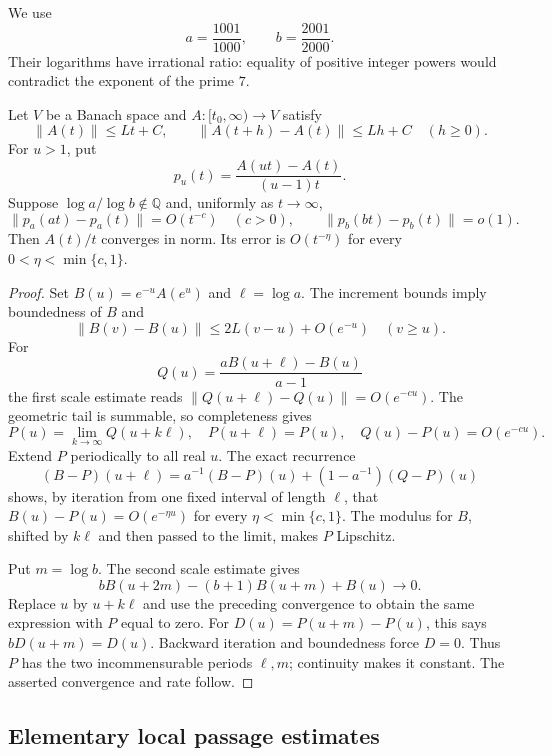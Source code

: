 We use
\begin{equation}\label{eq:ct-two-scales}
 a=\frac{1001}{1000},\qquad b=\frac{2001}{2000}.
\end{equation}
Their logarithms have irrational ratio: equality of positive integer
powers would contradict the exponent of the prime \(7\).

\begin{lemma}\label{lem:ct-two-scale}
Let \(V\) be a Banach space and \(A:[t_0,\infty)\to V\) satisfy
\[
 \|A(t)\|\le Lt+C,\qquad
 \|A(t+h)-A(t)\|\le Lh+C\quad(h\ge0).
\]
For \(u>1\), put
\[
 p_u(t)=\frac{A(ut)-A(t)}{(u-1)t}.
\]
Suppose \(\log a/\log b\notin\mathbb Q\) and, uniformly as
\(t\to\infty\),
\[
 \|p_a(at)-p_a(t)\|=O(t^{-c})\quad(c>0),\qquad
 \|p_b(bt)-p_b(t)\|=o(1).
\]
Then \(A(t)/t\) converges in norm. Its error is
\(O(t^{-\eta})\) for every \(0<\eta<\min\{c,1\}\).
\end{lemma}
\begin{proof}
Set \(B(u)=e^{-u}A(e^u)\) and \(\ell=\log a\).
The increment bounds imply boundedness of \(B\) and
\[
 \|B(v)-B(u)\|\le2L(v-u)+O(e^{-u})\quad(v\ge u).
\]
For
\[
 Q(u)=\frac{aB(u+\ell)-B(u)}{a-1}
\]
the first scale estimate reads
\(\|Q(u+\ell)-Q(u)\|=O(e^{-cu})\).
The geometric tail is summable, so completeness gives
\[
 P(u)=\lim_{k\to\infty}Q(u+k\ell),\quad
 P(u+\ell)=P(u),\quad Q(u)-P(u)=O(e^{-cu}).
\]
Extend \(P\) periodically to all real \(u\). The exact recurrence
\[
 (B-P)(u+\ell)
 =a^{-1}(B-P)(u)+(1-a^{-1})(Q-P)(u)
\]
shows, by iteration from one fixed interval of length \(\ell\),
that \(B(u)-P(u)=O(e^{-\eta u})\) for every
\(\eta<\min\{c,1\}\). The modulus for \(B\), shifted by \(k\ell\)
and then passed to the limit, makes \(P\) Lipschitz.

Put \(m=\log b\). The second scale estimate gives
\[
 bB(u+2m)-(b+1)B(u+m)+B(u)\longrightarrow0.
\]
Replace \(u\) by \(u+k\ell\) and use the preceding convergence to
obtain the same expression with \(P\) equal to zero.
For \(D(u)=P(u+m)-P(u)\), this says \(bD(u+m)=D(u)\).
Backward iteration and boundedness force \(D=0\).
Thus \(P\) has the two incommensurable periods \(\ell,m\);
continuity makes it constant. The asserted convergence and rate follow.
\end{proof}

\subsection{Elementary local passage estimates}

